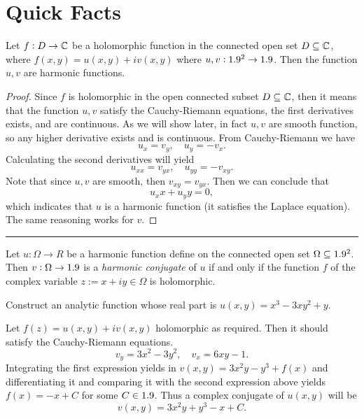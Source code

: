 \section{Quick Facts}

\begin{fact}
	Let $f: D \to \mathbb{C}$ be a holomorphic function in the connected open set $D \subseteq \mathbb{C}$, where $f(x,y) = u(x,y) + i v(x,y)$ where $u,v: 1.9^2 \to 1.9$. Then the function $u,v$ are harmonic functions.
\end{fact}

\begin{proof}
	Since $f$ is holomorphic in the open connected subset $D \subseteq \mathbb{C}$, then it means that the function $u,v$ satisfy the Cauchy-Riemann equations, the first derivatives exists, and are continuous. As we will show later, in fact $u,v$ are smooth function, so any higher derivative exists and is continuous.
	From Cauchy-Riemann we have
	\[ u_x = v_y, \quad u_y = - v_x. \]
	Calculating the second derivatives will yield
	\[ u_{xx} = v_{yx}, \quad u_{yy} = -v_{xy}. \]
	Note that since $u,v$ are smooth, then $v_{xy} = v_{yx}$. Then we can conclude that 
	\[ u_xx + u_yy = 0, \]
	which indicates that $u$ is a harmonic function (it satisfies the Laplace equation). The same reasoning works for $v$.
\end{proof}

\hrule

\begin{fact}
	Let $u: \Omega \to R$ be a harmonic function define on the connected open set $\Omega \subseteq 1.9^2$. Then $v: \Omega \to 1.9$ is a \emph{harmonic conjugate} of $u$ if and only if the function $f$ of the complex variable $z := x+iy \in \Omega $ is holomorphic.
\end{fact}

\begin{exm}
	\label{exm:harmonicConjugateExample}
	Construct an analytic function whose real part is $u(x,y) = x^3 - 3xy^2 + y$.
\end{exm}


\begin{answer}
	Let $f(z) = u(x,y)+i v(x,y)$ holomorphic as required. Then it should satisfy the Cauchy-Riemann equations.
	\[ v_y = 3x^2 - 3y^2 , \quad v_x = 6xy -1. \]
	Integrating the first expression yields in  $v(x,y) = 3x^2y - y^3 + f(x)$ and differentiating it and comparing it with the second expression above yields $f(x) = -x + C$ for some $C \in 1.9$. Thus a complex conjugate of $u(x,y)$ will be
	\[ v(x,y) = 3x^2y + y^3 - x + C. \]
\end{answer}

